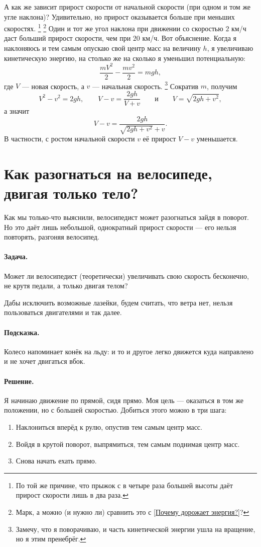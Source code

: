 А как же зависит прирост скорости от начальной скорости (при одном и том же угле наклона)?
Удивительно, но прирост оказывается больше при меньших скоростях.%
\footnote{По той же причине, что прыжок с в четыре раза большей высоты даёт прирост скорости лишь в два раза.}%
\footnote{Марк, а можно (и нужно ли) сравнить это с \ref{Почему дорожает энергия?}?\pr}
Один и тот же угол наклона при движении со скоростью $2$ км/ч даст больший прирост скорости, чем при $20$ км/ч.
Вот объяснение.
Когда я наклоняюсь и тем самым опускаю свой центр масс на
величину $h$, я увеличиваю кинетическую энергию, на столько же на сколько я уменьшил потенциальную:
\[
\frac{mV^2}2 - \frac{mv^2}2 = mgh,
\]
где $V$ — новая скорость, а $v$ — начальная скорость.%
\footnote{Замечу, что я поворачиваю, и часть кинетической энергии ушла на вращение, но я этим пренебрёг.}
Сократив $m$, получим
\[
V^2 - v^2 = 2gh,
\qquad
V - v=\frac{2gh}{V + v}
\qquad\text{и}\qquad
V=\sqrt{2gh+v^2},\]
а значит
\[V - v=\frac{2gh}{\sqrt{2gh+v^2} + v}.\]
В частности,
с ростом начальной скорости $v$
её прирост $V - v$ уменьшается.

\section{Как разогнаться на велосипеде, двигая только тело?}

Как мы только-что выяснили, велосипедист может разогнаться зайдя в поворот.
Но это даёт лишь небольшой, однократный прирост скорости --- его нельзя повторять, разгоняя велосипед.

\paragraph{Задача.}
Может ли велосипедист (теоретически) увеличивать свою скорость бесконечно, не крутя педали, а только двигая телом?

Дабы исключить возможные лазейки, будем считать, что ветра нет, нельзя пользоваться двигателями и так далее.

\paragraph{Подсказка.}
Колесо напоминает конёк на льду: и то и другое легко движется куда направлено и не хочет двигаться вбок.

\paragraph{Решение.}
Я начинаю движение по прямой, сидя прямо.
Моя цель — оказаться в том же положении, но с большей скоростью.
Добиться этого можно в три шага:
\begin{enumerate}
\item Наклониться вперёд к рулю, опустив тем самым центр масс.
\item Войдя в крутой поворот, выпрямиться, тем самым поднимая центр масс.
\item Снова начать ехать прямо.
\end{enumerate}

